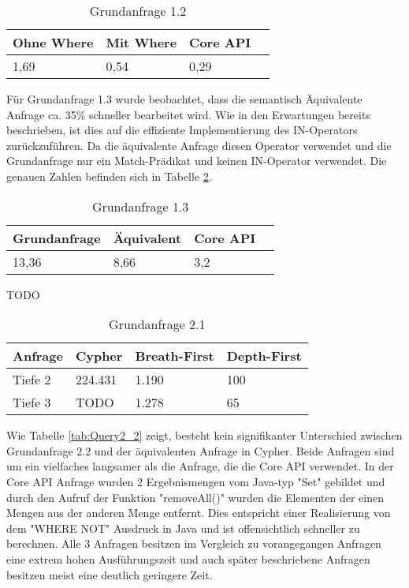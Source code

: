 \FloatBarrier
\begin{table}[h]
	\centering
		\begin{tabular}{ |p{3cm}|p{3cm}|p{3cm}|p{3cm}|  }
			\hline
			Ohne Where& Mit Where  &Core API\\
			\hline
			1,69   &  0,54  &0,29 \\
			\hline
		\end{tabular}
		\FloatBarrier
		\caption{Grundanfrage 1.2}
		\label{tab:Query1_2}
\end{table}
\FloatBarrier
Für Grundanfrage 1.3 wurde beobachtet, dass die semantisch Äquivalente Anfrage ca. 35\% schneller bearbeitet wird. Wie in den Erwartungen bereits beschrieben, ist dies auf die effiziente Implementierung des IN-Operators zurückzuführen. Da die äquivalente Anfrage diesen Operator verwendet und die Grundanfrage nur ein Match-Prädikat und keinen IN-Operator verwendet.
Die genauen Zahlen befinden sich in Tabelle		\ref{tab:Query1_3}.
\begin{table}[h]
	\centering
		\begin{tabular}{ |p{3cm}|p{3cm}|p{3cm}|p{3cm}|  }
			\hline
			Grundanfrage & Äquivalent&Core API\\
			\hline
			 13,36    & 8,66 &  3,2\\
			\hline
		\end{tabular}
		\caption{Grundanfrage 1.3}
		\label{tab:Query1_3}
\end{table}
\FloatBarrier
TODO
\FloatBarrier
\begin{table}[h]
\centering
		\begin{tabular}{ |p{3cm}||p{3cm}|p{3cm}|p{3cm}|  }
			\hline
			Anfrage& Cypher & Breath-First&Depth-First\\
			\hline
			Tiefe 2   & 224.431    & 1.190&  100\\
			Tiefe 3&    TODO  & 1.278   & 65\\
			\hline
		\end{tabular}
		\caption{Grundanfrage 2.1}
\end{table}
\FloatBarrier
Wie Tabelle \ref{tab:Query2_2} zeigt, besteht kein  signifikanter Unterschied zwischen Grundanfrage 2.2 und der äquivalenten Anfrage in Cypher. Beide Anfragen sind um ein vielfaches langsamer als die Anfrage, die die Core API verwendet. In der Core API Anfrage wurden 2 Ergebnismengen vom Java-typ "Set" gebildet und durch den Aufruf der Funktion "removeAll()" wurden die Elementen der einen Mengen aus der anderen Menge entfernt. Dies entspricht einer Realisierung von dem "WHERE NOT" Ausdruck  in Java und ist offensichtlich schneller zu berechnen. Alle 3 Anfragen besitzen im Vergleich zu vorangegangen Anfragen eine extrem hohen Ausführungszeit und auch später beschriebene Anfragen besitzen meist eine deutlich geringere Zeit.

